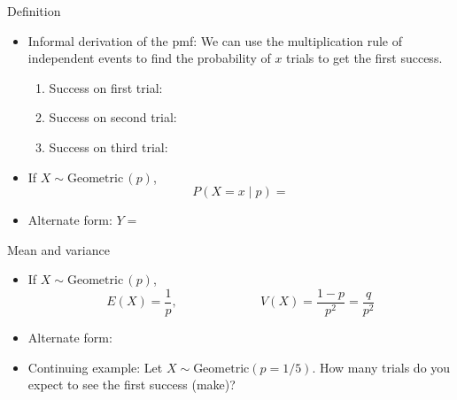 \documentclass{article}
\newcommand{\follow}[1]{\sim \text{#1}\,}		%
\begin{document}
Definition\bigskip
\begin{itemize}
    \item Informal derivation of the pmf: We can use the multiplication rule of independent events to find the probability of $x$ trials to get the first success.\bigskip
    \begin{enumerate}
        \item Success on first trial:\bigskip
        \item Success on second trial:\bigskip
        \item Success on third trial:\bigskip
    \end{enumerate}\vspace{40pt}
    \item If $X \follow{Geometric}(p)$,
    \[P(X = x \mid p) =  \]\bigskip
    \item[] Alternate form: $Y = $\bigskip
\end{itemize}\bigskip

Mean and variance\bigskip
\begin{itemize}
    \item If $X \follow{Geometric}(p)$,
    \[E(X) = \frac{1}{p}, \hspace{80pt} V(X) = \frac{1 - p}{p^2} = \frac{q}{p^2}\]\bigskip
    \item[] Alternate form:\bigskip
    \item Continuing example: Let $X \sim \text{Geometric}(p = 1/5)$. How many trials do you expect to see the first success (make)?
\end{itemize}

\newpage
\end{document}
